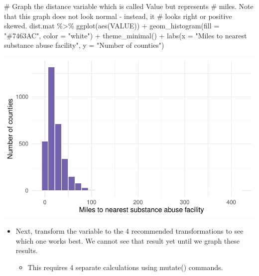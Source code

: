 \documentclass[
  letterpaper,
  DIV=11,
  numbers=noendperiod]{scrreprt}
\newenvironment{Shaded}{\begin{snugshade}}{\end{snugshade}}
\newcommand{\AttributeTok}[1]{\textcolor[rgb]{0.40,0.45,0.13}{#1}}
\newcommand{\CommentTok}[1]{\textcolor[rgb]{0.37,0.37,0.37}{#1}}
\newcommand{\FunctionTok}[1]{\textcolor[rgb]{0.28,0.35,0.67}{#1}}
\newcommand{\NormalTok}[1]{\textcolor[rgb]{0.00,0.23,0.31}{#1}}
\newcommand{\SpecialCharTok}[1]{\textcolor[rgb]{0.37,0.37,0.37}{#1}}
\newcommand{\StringTok}[1]{\textcolor[rgb]{0.13,0.47,0.30}{#1}}
\providecommand{\tightlist}{%
  \setlength{\itemsep}{0pt}\setlength{\parskip}{0pt}}\usepackage{longtable,booktabs,array}
\begin{document}
\begin{Shaded}
\begin{Highlighting}[]
\CommentTok{\# Graph the distance variable which is called Value but represents}
\CommentTok{\# miles.  Note that this graph does not look normal {-} instead, it}
\CommentTok{\# looks right or positive skewed.}
\NormalTok{dist.mat }\SpecialCharTok{\%\textgreater{}\%}
    \FunctionTok{ggplot}\NormalTok{(}\FunctionTok{aes}\NormalTok{(VALUE)) }\SpecialCharTok{+} \FunctionTok{geom\_histogram}\NormalTok{(}\AttributeTok{fill =} \StringTok{"\#7463AC"}\NormalTok{, }\AttributeTok{color =} \StringTok{"white"}\NormalTok{) }\SpecialCharTok{+}
    \FunctionTok{theme\_minimal}\NormalTok{() }\SpecialCharTok{+} \FunctionTok{labs}\NormalTok{(}\AttributeTok{x =} \StringTok{"Miles to nearest substance abuse facility"}\NormalTok{,}
    \AttributeTok{y =} \StringTok{"Number of counties"}\NormalTok{)}
\end{Highlighting}
\end{Shaded}

\includegraphics{probability_files/figure-pdf/unnamed-chunk-57-1.pdf}

\begin{itemize}
\tightlist
\item
  Next, transform the variable to the 4 recommended transformations to
  see which one works best. We cannot see that result yet until we graph
  these results.

  \begin{itemize}
  \tightlist
  \item
    This requires 4 separate calculations using mutate() commands.
  \end{itemize}
\end{itemize}
\end{document}
